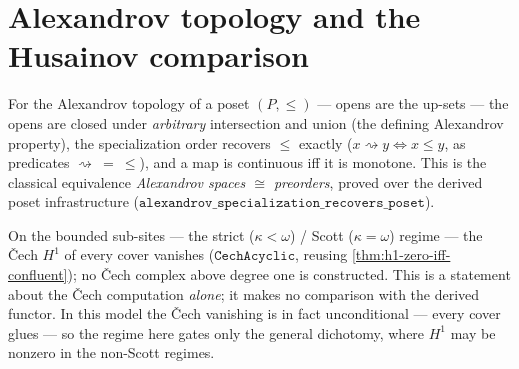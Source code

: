\section{Alexandrov topology and the Husainov comparison}

\begin{theorem}\label{thm:alexandrov-recovers-poset}\leanok{}
For the Alexandrov topology of a poset $(P,\le)$ --- opens are the up-sets --- the opens are
closed under \emph{arbitrary} intersection and union (the defining Alexandrov property), the
specialization order recovers $\le$ exactly ($x \rightsquigarrow y \iff x \le y$, as predicates
$\rightsquigarrow\ =\ \le$), and a map is continuous iff it is monotone. This is the classical
equivalence \emph{Alexandrov spaces $\cong$ preorders}, proved over the derived poset
infrastructure ($\texttt{alexandrov\_specialization\_recovers\_poset}$).
\end{theorem}
\begin{theorem}\label{thm:husainov-cech-acyclic}\leanok{}
On the bounded sub-sites --- the strict ($\kappa<\omega$) / Scott ($\kappa=\omega$) regime --- the
\v{C}ech $H^1$ of every cover vanishes ($\texttt{CechAcyclic}$, reusing
\cref{thm:h1-zero-iff-confluent}); no \v{C}ech complex above degree one is constructed. This is a
statement about the \v{C}ech computation \emph{alone}; it makes no comparison with the derived
functor. In this model the \v{C}ech vanishing is in fact unconditional --- every cover glues ---
so the regime here gates only the general dichotomy, where $H^1$ may be nonzero in the non-Scott
regimes.
\end{theorem}
